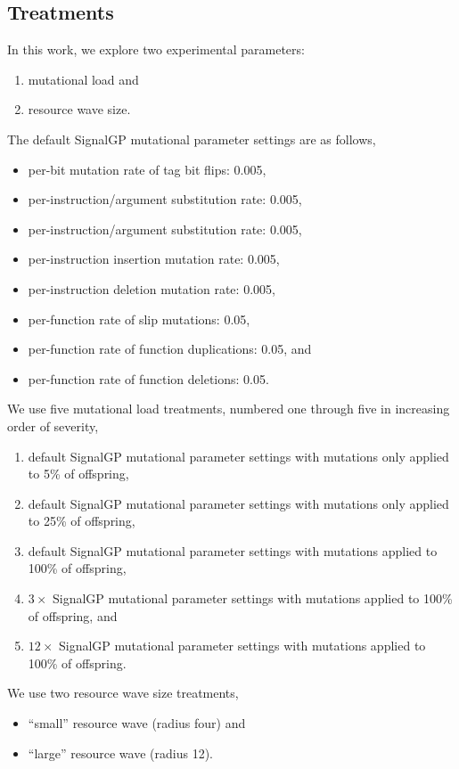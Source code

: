 \subsection{Treatments}

In this work, we explore two experimental parameters:
\begin{enumerate}
\item mutational load and
\item resource wave size.
\end{enumerate}

The default SignalGP mutational parameter settings are as follows,
\begin{itemize}
\item per-bit mutation rate of tag bit flips: 0.005,
\item per-instruction/argument substitution rate: 0.005,
\item per-instruction/argument substitution rate: 0.005,
\item per-instruction insertion mutation rate: 0.005,
\item per-instruction deletion mutation rate: 0.005,
\item per-function rate of slip mutations: 0.05,
\item per-function rate of function duplications: 0.05, and
\item per-function rate of function deletions: 0.05.
\end{itemize}

We use five mutational load treatments, numbered one through five in increasing order of severity,
\begin{enumerate}
\item default SignalGP mutational parameter settings with mutations only applied to 5\% of offspring,
\item default SignalGP mutational parameter settings with mutations only applied to 25\% of offspring,
\item default SignalGP mutational parameter settings with mutations applied to 100\% of offspring,
\item $3\times$ SignalGP mutational parameter settings with mutations applied to 100\% of offspring, and
\item $12\times$ SignalGP mutational parameter settings with mutations applied to 100\% of offspring.
\end{enumerate}

We use two resource wave size treatments,
\begin{itemize}
\item ``small'' resource wave (radius four) and
\item ``large'' resource wave (radius 12).
\end{itemize}

